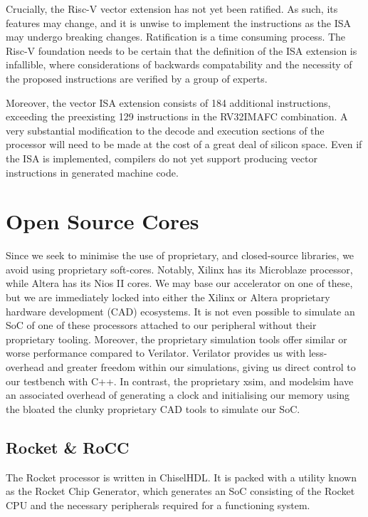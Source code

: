 \documentclass[a4paper,8pt]{report}
\begin{document}
Crucially, the Risc-V vector extension has not yet been ratified. As such, its
features may change, and it is unwise to implement the instructions as the ISA
may undergo breaking changes. Ratification is a time consuming process. The
Risc-V foundation needs to be certain that the definition of the ISA extension
is infallible, where considerations of backwards compatability and the necessity of
the proposed instructions are verified by a group of experts.

Moreover, the vector ISA extension consists of 184
additional instructions, exceeding the preexisting 129 instructions in the
RV32IMAFC combination. A very substantial modification to the decode and
execution sections of the processor will need to be made at the cost of a great
deal of silicon space. Even if the ISA is implemented, compilers do not yet
support producing vector instructions in generated machine code.

\section{Open Source Cores}
Since we seek to minimise the use of proprietary, and closed-source libraries,
we avoid using proprietary soft-cores. Notably, Xilinx has its Microblaze
processor, while Altera has its Nios II cores. We may base our accelerator on
one of these, but we are immediately locked into either the Xilinx or Altera
proprietary hardware development (CAD) ecosystems. It is not even possible to
simulate an SoC of one of these processors attached to our peripheral without
their proprietary tooling.
Moreover, the proprietary simulation tools offer similar or worse performance
compared to Verilator. Verilator provides us with less-overhead and greater
freedom within our simulations, giving us direct control to our testbench with
C++. In contrast, the proprietary xsim, and modelsim have an associated overhead
of generating a clock and initialising our memory using the bloated the clunky
proprietary CAD tools to simulate our SoC.

\subsection{Rocket \& RoCC}
The Rocket processor is written in ChiselHDL. It is packed with a utility known
as the Rocket Chip Generator, which generates an SoC consisting of the Rocket
CPU and the necessary peripherals required for a functioning system. 
\end{document}

